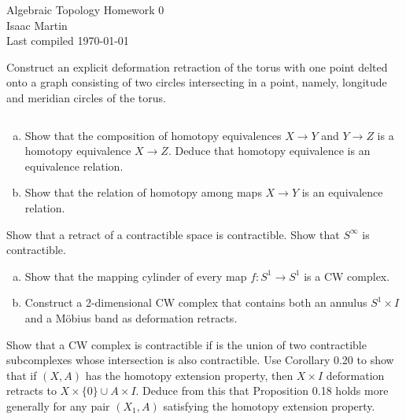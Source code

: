 

\def\sset{\subseteq}
\def\iso{\cong}
\def\gend#1{\langle #1\rangle}


\pagestyle{empty}
	\LARGE
\begin{center}
	Algebraic Topology Homework 0 \\
	\Large
	Isaac Martin \\
    Last compiled \today
\end{center}
\normalsize
\vspace{-2mm}
\hru
\begin{homework}[e]
	\prob Construct an explicit deformation retraction of the torus with one point delted onto a graph consisting of two circles intersecting in a point, namely, longitude and meridian circles of the torus.

	\prob $ $
	\begin{enumerate}[(a)]
		\item Show that the composition of homotopy equivalences $X\to Y$ and $Y\to Z$ is a homotopy equivalence $X\to Z$. Deduce that homotopy equivalence is an equivalence relation.
		\item Show that the relation of homotopy among maps $X \to Y$ is an equivalence relation.
	\end{enumerate}

	\prob Show that a retract of a contractible space is contractible.
	\prob Show that $S^\infty$ is contractible.
	\prob $ $
	\begin{enumerate}[(a)]
		\item Show that the mapping cylinder of every map $f:S^1 \to S^1$ is a CW complex.
		\item Construct a 2-dimensional CW complex that contains both an annulus $S^1\times I$ and a M\"obius band as deformation retracts.
	\end{enumerate}
	\prob Show that a CW complex is contractible if is the union of two contractible subcomplexes whose intersection is also contractible.
	\prob Use Corollary 0.20 to show that if $(X,A)$ has the homotopy extension property, then $X\times I$ deformation retracts to $X\times \{0\}\cup A\times I$. Deduce from this that Proposition 0.18 holds more generally for any pair $(X_1,A)$ satisfying the homotopy extension property.
\end{homework}

